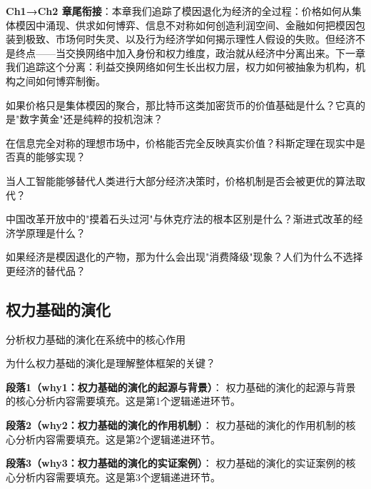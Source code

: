 \documentclass[../main.tex]{subfiles}
\begin{document}
{{	%
	\textbf{Ch1→Ch2 章尾衔接}：本章我们追踪了模因退化为经济的全过程：价格如何从集体模因中涌现、供求如何博弈、信息不对称如何创造利润空间、金融如何把模因包装到极致、市场何时失灵、以及行为经济学如何揭示理性人假设的失败。但经济不是终点——当交换网络中加入身份和权力维度，政治就从经济中分离出来。下一章我们追踪这个分离：利益交换网络如何生长出权力层，权力如何被抽象为机构，机构之间如何博弈制衡。

	\begin{reader_anticipation}
		\item 如果价格只是集体模因的聚合，那比特币这类加密货币的价值基础是什么？它真的是"数字黄金"还是纯粹的投机泡沫？
		\item 在信息完全对称的理想市场中，价格能否完全反映真实价值？科斯定理在现实中是否真的能够实现？
		\item 当人工智能能够替代人类进行大部分经济决策时，价格机制是否会被更优的算法取代？
		\item 中国改革开放中的"摸着石头过河"与休克疗法的根本区别是什么？渐进式改革的经济学原理是什么？
		\item 如果经济是模因退化的产物，那为什么会出现"消费降级"现象？人们为什么不选择更经济的替代品？
	\end{reader_anticipation}



\subsection{权力基础的演化}

\begin{motivation}
分析权力基础的演化在系统中的核心作用
\end{motivation}

\begin{logicmap}
[逻辑链占位]
\end{logicmap}

\begin{questionbox}
为什么权力基础的演化是理解整体框架的关键？
\end{questionbox}

\textbf{段落1（why1：权力基础的演化的起源与背景）}：
权力基础的演化的起源与背景的核心分析内容需要填充。这是第1个逻辑递进环节。


\textbf{段落2（why2：权力基础的演化的作用机制）}：
权力基础的演化的作用机制的核心分析内容需要填充。这是第2个逻辑递进环节。


\textbf{段落3（why3：权力基础的演化的实证案例）}：
权力基础的演化的实证案例的核心分析内容需要填充。这是第3个逻辑递进环节。


}}
\end{document}
